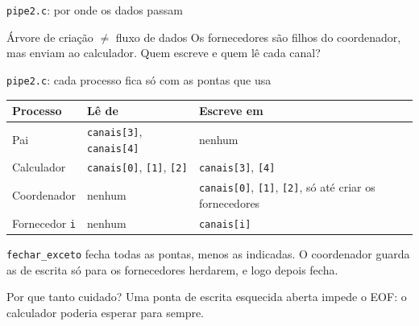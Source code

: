 \documentclass[aspectratio=169]{beamer}
\begin{document}
\begin{frame}{\texttt{pipe2.c}: por onde os dados passam}
\begin{center}
\end{center}

\vspace{0.3em}
\begin{alertblock}{Árvore de criação $\neq$ fluxo de dados}
Os fornecedores são filhos do coordenador, mas enviam ao calculador. Quem escreve e quem lê cada canal?
\end{alertblock}
\end{frame}

\begin{frame}{\texttt{pipe2.c}: cada processo fica só com as pontas que usa}
\begin{center}
\small
\begin{tabular}{@{}lll@{}}
\toprule
\textbf{Processo} & \textbf{Lê de} & \textbf{Escreve em} \\
\midrule
Pai & \texttt{canais[3]}, \texttt{canais[4]} & nenhum \\
Calculador & \texttt{canais[0]}, \texttt{[1]}, \texttt{[2]} & \texttt{canais[3]}, \texttt{[4]} \\
Coordenador & nenhum & \texttt{canais[0]}, \texttt{[1]}, \texttt{[2]}, só até criar os fornecedores \\
Fornecedor \texttt{i} & nenhum & \texttt{canais[i]} \\
\bottomrule
\end{tabular}
\end{center}

\small \texttt{fechar\_exceto} fecha todas as pontas, menos as indicadas. O coordenador guarda as de escrita só para os fornecedores herdarem, e logo depois fecha.

\begin{alertblock}{Por que tanto cuidado?}
Uma ponta de escrita esquecida aberta impede o EOF: o calculador poderia esperar para sempre.
\end{alertblock}
\end{frame}
\end{document}
